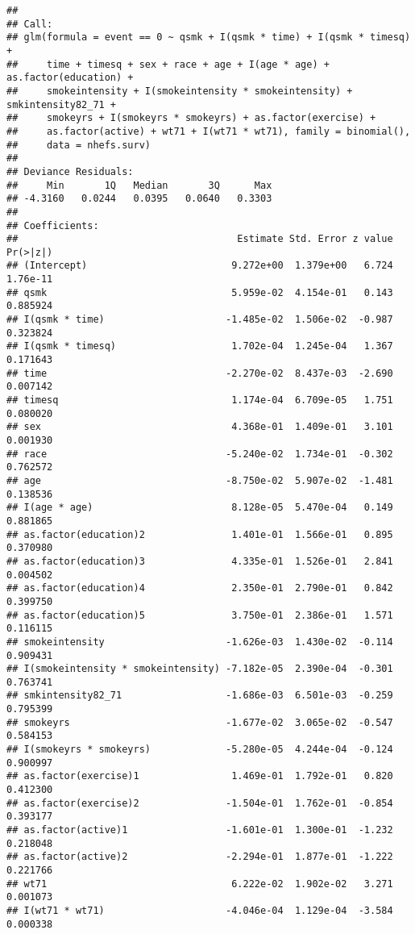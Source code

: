 \documentclass[10pt,]{book}
\begin{document}
\begin{verbatim}
## 
## Call:
## glm(formula = event == 0 ~ qsmk + I(qsmk * time) + I(qsmk * timesq) + 
##     time + timesq + sex + race + age + I(age * age) + as.factor(education) + 
##     smokeintensity + I(smokeintensity * smokeintensity) + smkintensity82_71 + 
##     smokeyrs + I(smokeyrs * smokeyrs) + as.factor(exercise) + 
##     as.factor(active) + wt71 + I(wt71 * wt71), family = binomial(), 
##     data = nhefs.surv)
## 
## Deviance Residuals: 
##     Min       1Q   Median       3Q      Max  
## -4.3160   0.0244   0.0395   0.0640   0.3303  
## 
## Coefficients:
##                                      Estimate Std. Error z value Pr(>|z|)
## (Intercept)                         9.272e+00  1.379e+00   6.724 1.76e-11
## qsmk                                5.959e-02  4.154e-01   0.143 0.885924
## I(qsmk * time)                     -1.485e-02  1.506e-02  -0.987 0.323824
## I(qsmk * timesq)                    1.702e-04  1.245e-04   1.367 0.171643
## time                               -2.270e-02  8.437e-03  -2.690 0.007142
## timesq                              1.174e-04  6.709e-05   1.751 0.080020
## sex                                 4.368e-01  1.409e-01   3.101 0.001930
## race                               -5.240e-02  1.734e-01  -0.302 0.762572
## age                                -8.750e-02  5.907e-02  -1.481 0.138536
## I(age * age)                        8.128e-05  5.470e-04   0.149 0.881865
## as.factor(education)2               1.401e-01  1.566e-01   0.895 0.370980
## as.factor(education)3               4.335e-01  1.526e-01   2.841 0.004502
## as.factor(education)4               2.350e-01  2.790e-01   0.842 0.399750
## as.factor(education)5               3.750e-01  2.386e-01   1.571 0.116115
## smokeintensity                     -1.626e-03  1.430e-02  -0.114 0.909431
## I(smokeintensity * smokeintensity) -7.182e-05  2.390e-04  -0.301 0.763741
## smkintensity82_71                  -1.686e-03  6.501e-03  -0.259 0.795399
## smokeyrs                           -1.677e-02  3.065e-02  -0.547 0.584153
## I(smokeyrs * smokeyrs)             -5.280e-05  4.244e-04  -0.124 0.900997
## as.factor(exercise)1                1.469e-01  1.792e-01   0.820 0.412300
## as.factor(exercise)2               -1.504e-01  1.762e-01  -0.854 0.393177
## as.factor(active)1                 -1.601e-01  1.300e-01  -1.232 0.218048
## as.factor(active)2                 -2.294e-01  1.877e-01  -1.222 0.221766
## wt71                                6.222e-02  1.902e-02   3.271 0.001073
## I(wt71 * wt71)                     -4.046e-04  1.129e-04  -3.584 0.000338

\end{verbatim}
\end{document}
